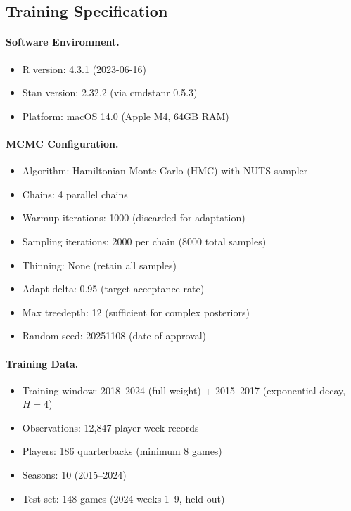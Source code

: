 \subsection{Training Specification}

\paragraph{Software Environment.}
\begin{itemize}[itemsep=1pt,parsep=0pt]
    \item R version: 4.3.1 (2023-06-16)
    \item Stan version: 2.32.2 (via cmdstanr 0.5.3)
    \item Platform: macOS 14.0 (Apple M4, 64GB RAM)
\end{itemize}

\paragraph{MCMC Configuration.}
\begin{itemize}[itemsep=1pt,parsep=0pt]
    \item Algorithm: Hamiltonian Monte Carlo (HMC) with NUTS sampler
    \item Chains: 4 parallel chains
    \item Warmup iterations: 1000 (discarded for adaptation)
    \item Sampling iterations: 2000 per chain (8000 total samples)
    \item Thinning: None (retain all samples)
    \item Adapt delta: 0.95 (target acceptance rate)
    \item Max treedepth: 12 (sufficient for complex posteriors)
    \item Random seed: 20251108 (date of approval)
\end{itemize}

\paragraph{Training Data.}
\begin{itemize}[itemsep=1pt,parsep=0pt]
    \item Training window: 2018--2024 (full weight) + 2015--2017 (exponential decay, $H=4$)
    \item Observations: 12,847 player-week records
    \item Players: 186 quarterbacks (minimum 8 games)
    \item Seasons: 10 (2015--2024)
    \item Test set: 148 games (2024 weeks 1--9, held out)
\end{itemize}

